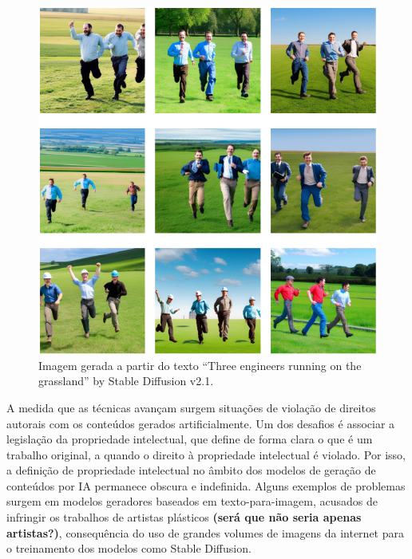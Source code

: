 \begin{figure}
  \centering 
  \includegraphics[scale=0.47]{images_generated_with_text_three_engineers.png}
  \caption{Imagem gerada a partir do texto ``Three engineers running on the grassland'' \space  by Stable Diffusion v2.1.}
  \label{fig:images_of_three_engineers}
\end{figure}



A medida que as técnicas avançam surgem situações de violação de direitos autorais
com os conteúdos gerados artificialmente. Um dos desafios é associar a legislação da propriedade intelectual, 
que define de forma clara o que é um trabalho original, 
a quando o direito à propriedade intelectual é violado. Por isso, a definição de propriedade intelectual no âmbito 
dos modelos de geração de conteúdos por IA permanece obscura e indefinida.
Alguns exemplos de problemas surgem em modelos geradores 
baseados em texto-para-imagem, acusados de infringir os trabalhos de artistas plásticos \textbf{(será que não seria apenas artistas?)}, 
consequência do uso de grandes volumes de imagens da internet para o treinamento dos modelos como Stable Diffusion.





